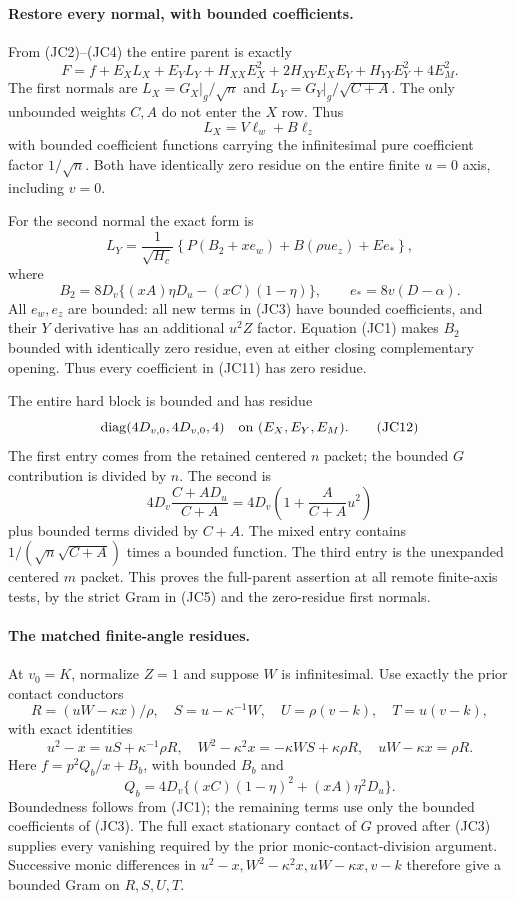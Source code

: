 \paragraph{Restore every normal, with bounded coefficients.}
From (JC2)--(JC4) the entire parent is exactly
\[
 F=f+E_XL_X+E_YL_Y+
 H_{XX}E_X^2+2H_{XY}E_XE_Y+H_{YY}E_Y^2+4E_M^2.        \tag{JC10}
\]
The first normals are $L_X=G_X|_g/\sqrt n$ and
$L_Y=G_Y|_g/\sqrt{C+A}$.  The only unbounded weights $C,A$ do not
enter the $X$ row.  Thus
\[
 L_X=V\ell_w+B\ell_z
\]
with bounded coefficient functions carrying the infinitesimal
pure coefficient factor $1/\sqrt n$.  Both have identically zero
residue on the entire finite $u=0$ axis, including $v=0$.

For the second normal the exact form is
\[
 L_Y=\frac1{\sqrt{H_c}}\left\{
 P(B_2+xe_w)+B(\rho u e_z)+E e_*\right\},            \tag{JC11}
\]
where
\[
 B_2=8D_v\{(xA)\eta D_u-(xC)(1-\eta)\},\qquad
 e_*=8v(D-\alpha).
\]
All $e_w,e_z$ are bounded: all new terms in (JC3) have bounded
coefficients, and their $Y$ derivative has an additional $u^2Z$
factor.  Equation (JC1) makes $B_2$ bounded with identically zero
residue, even at either closing complementary opening.  Thus every
coefficient in (JC11) has zero residue.

The entire hard block is bounded and has residue
\[
             \operatorname{diag}(4D_{v,0},4D_{v,0},4)
                   \quad\hbox{on }(E_X,E_Y,E_M).      \tag{JC12}
\]
The first entry comes from the retained centered $n$ packet;
the bounded $G$ contribution is divided by $n$.  The second is
\[
 4D_v\frac{C+AD_u}{C+A}
   =4D_v\left(1+\frac A{C+A}u^2\right)
\]
plus bounded terms divided by $C+A$.  The mixed entry contains
$1/(\sqrt n\sqrt{C+A})$ times a bounded function.  The third
entry is the unexpanded centered $m$ packet.  This proves the
full-parent assertion at all remote finite-axis tests, by the
strict Gram in (JC5) and the zero-residue first normals.

\paragraph{The matched finite-angle residues.}
At $v_0=K$, normalize $Z=1$ and suppose $W$ is infinitesimal.
Use exactly the prior contact conductors
\[
 R=(uW-\kappa x)/\rho,\quad S=u-\kappa^{-1}W,
 \quad U=\rho(v-k),\quad T=u(v-k),
\]
with exact identities
\[
 u^2-x=uS+\kappa^{-1}\rho R,\quad
 W^2-\kappa^2x=-\kappa WS+\kappa\rho R,
 \quad uW-\kappa x=\rho R.                           \tag{JC13}
\]
Here $f=p^2Q_b/x+B_b$, with bounded $B_b$ and
\[
 Q_b=4D_v\{(xC)(1-\eta)^2+(xA)\eta^2D_u\}.
\]
Boundedness follows from (JC1); the remaining terms use only
the bounded coefficients of (JC3).  The full exact stationary
contact of $G$ proved after (JC3) supplies every vanishing required
by the prior monic-contact-division argument.  Successive monic
differences in $u^2-x,W^2-\kappa^2x,uW-\kappa x,v-k$ therefore
give a bounded Gram on $R,S,U,T$.

